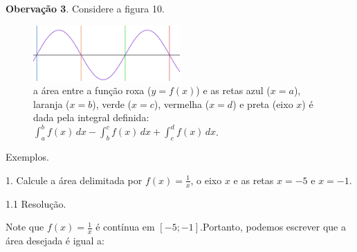 \documentclass{article}
\begin{document}
{\begin{newpage}
\textbf{Obervação 3}. Considere a figura 10.
\begin{figure}[htbp]
\begin{center}
\includegraphics[width=0.5\textwidth, angle=0]{Grafico12.png}
\end{center}
\caption{a área entre a função roxa ($y=f(x)$) e as retas azul ($x=a$), laranja ($x=b$), verde ($x=c$), vermelha ($x=d$) e preta (eixo $x$)  é dada pela integral definida: $\displaystyle{\int_{a}^{b} f(x)\, dx - \int_{b}^{c} f(x)\, dx  + \int_{c}^{d} f(x)\, dx }$. }
\end{figure}
\par
\vspace{0.3cm}
Exemplos.
\par
\begin{flushleft}
1. Calcule a área delimitada por $f(x)=\displaystyle{\frac{1}{x}}$, o eixo $x$ e as retas $x=-5$ e $x=-1$.
\end{flushleft}
\par
\vspace{0.3cm}
\begin{flushleft}
1.1 Resolução.
\end{flushleft}
\par Note que $f(x)=\displaystyle{\frac{1}{x}}$ é contínua em $[-5;-1]$.Portanto, podemos escrever que a área desejada é igual a:


\end{newpage}}
\end{document}
